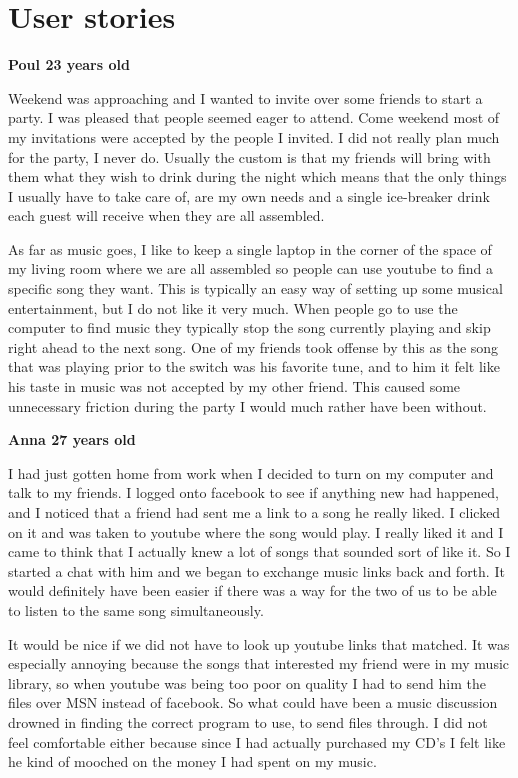 \section{User stories}


\noindent
\textbf{Poul 23 years old}

\vspace{5 mm}
\noindent
Weekend was approaching and I wanted to invite over some friends to start a party. I was pleased that people seemed eager to attend. Come weekend most of my invitations were accepted by the people I invited. I did not really plan much for the party, I never do. Usually the custom is that my friends will bring with them what they wish to drink during the night which means that the only things I usually have to take care of, are my own needs and a single ice-breaker drink each guest will receive when they are all assembled.  

As far as music goes, I like to keep a single laptop in the corner of the space of my living room where we are all assembled so people can use youtube to find a specific song they want. This is typically an easy way of setting up some musical entertainment, but I do not like it very much. When people go to use the computer to find music they typically stop the song currently playing and skip right ahead to the next song. One of my friends took offense by this as the song that was playing prior to the switch was his favorite tune, and to him it felt like his taste in music was not accepted by my other friend. This caused some unnecessary friction during the party I would much rather have been without.

\vspace{5 mm}
\noindent
\textbf{Anna 27 years old}

\vspace{5 mm}
\noindent
I had just gotten home from work when I decided to turn on my computer and talk to my friends. I logged onto facebook to see if anything new had happened, and I noticed that a friend had sent me a link to a song he really liked. I clicked on it and was taken to youtube where the song would play. I really liked it and I came to think that I actually knew a lot of songs that sounded sort of like it. So I started a chat with him and we began to exchange music links back and forth. It would definitely have been easier if there was a way for the two of us to be able to listen to the same song simultaneously. 

It would be nice if we did not have to look up youtube links that matched. It was especially annoying because the songs that interested my friend were in my music library, so when youtube was being too poor on quality I had to send him the files over MSN instead of facebook. So what could have been a music discussion drowned in finding the correct program to use, to send files through. I did not feel comfortable either because since I had actually purchased my CD's I felt like he kind of mooched on the money I had spent on my music.

